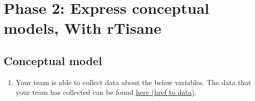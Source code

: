 \documentclass[
]{article}
\author{}
\date{\vspace{-2.5em}}
\providecommand{\tightlist}{%
  \setlength{\itemsep}{0pt}\setlength{\parskip}{0pt}}
\begin{document}
\setcounter{page}{172}

\hypertarget{conceptual-model}{%
\section{Phase 2: Express conceptual models, With rTisane}
\subsection{Conceptual model}\label{conceptual-model}}

\begin{enumerate}
\def\labelenumi{\arabic{enumi}.}
\tightlist
\item
  Your team is able to collect data about the below variables. The data
  that your team has collected can be found
  \href{https://homes.cs.washington.edu/~emjun/income_final.csv}{here (href to data)}.
\end{enumerate}
\end{document}
